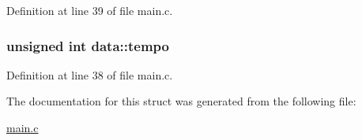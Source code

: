 Definition at line 39 of file main.\+c.

\hypertarget{structdata_a31232da79683035a6ff185f530da6c24}{
\subsubsection[{tempo}]{\setlength{\rightskip}{0pt plus 5cm}unsigned int data\+::tempo}}\label{structdata_a31232da79683035a6ff185f530da6c24}


Definition at line 38 of file main.\+c.



The documentation for this struct was generated from the following file\+:\begin{DoxyCompactItemize}
\item 
\hyperlink{main_8c}{main.\+c}\end{DoxyCompactItemize}
